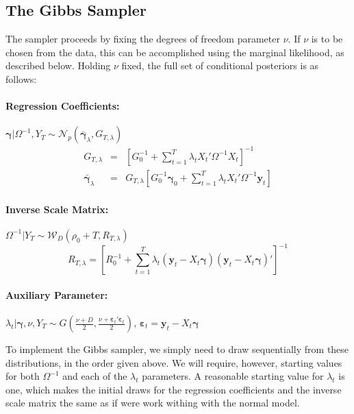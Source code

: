 \documentclass[12pt]{article}
\begin{document}
\subsection{The Gibbs Sampler}
The sampler proceeds by fixing the degrees of freedom parameter $\nu$.
If $\nu$ is to be chosen from the data, this can be accomplished using the marginal likelihood, as described below.
Holding $\nu$ fixed, the full set of conditional posteriors is as follows:

\paragraph{Regression Coefficients:} 
$\boldsymbol{\gamma}|\Omega^{-1},Y_T \sim \mathcal{N}_p\left( \bar{\boldsymbol{\gamma}}_{\lambda},G_{T,\lambda} \right)$
\begin{eqnarray*}
	G_{T,\lambda} &=& \left[ G_0^{-1} + \sum_{t=1}^T \lambda_t X_t' \Omega^{-1} X_t \right]^{-1}\\
	\bar{\boldsymbol{\gamma}}_{\lambda} &=& G_{T,\lambda} \left[ G_0^{-1}\boldsymbol{\gamma}_0 + \sum_{t=1}^{T}\lambda_t X_t'\Omega^{-1}\mathbf{y}_t \right]
\end{eqnarray*}
\paragraph{Inverse Scale Matrix:}
$\Omega^{-1}|Y_T \sim \mathcal{W}_D\left(\rho_0 + T, R_{T,\lambda}\right)$
\begin{equation*}
R_{T,\lambda} = \left[ R_0^{-1} + \sum_{t=1}^{T} \lambda_t\left( \mathbf{y}_t - X_t \boldsymbol{\gamma} \right)\left( \mathbf{y}_t - X_t \boldsymbol{\gamma} \right)' \right]^{-1}
\end{equation*}

\paragraph{Auxiliary Parameter:} $\lambda_t|\boldsymbol{\gamma}, \nu, Y_T \sim G\left(\displaystyle \frac{\nu + D}{2}, \frac{\nu + \boldsymbol{\varepsilon}_t' \boldsymbol{\varepsilon}_t}{2} \right)$, $\boldsymbol{\varepsilon}_t = \mathbf{y}_t - X_t \boldsymbol{\gamma}$

To implement the Gibbs sampler, we simply need to draw sequentially from these distributions, in the order given above. 
We will require, however, starting values for both $\Omega^{-1}$ and each of the $\lambda_t$ parameters. 
A reasonable starting value for $\lambda_t$ is one, which makes the initial draws for the regression coefficients and the inverse scale matrix the same as if were work withing with the normal model.
\end{document}
